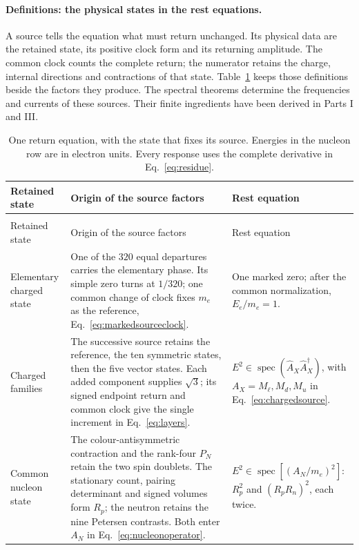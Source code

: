 \documentclass[aps,prx,onecolumn,10pt,notitlepage,nofootinbib,longbibliography]{revtex4-2}
\numberwithin{equation}{section}
\numberwithin{table}{section}
\begin{document}
\paragraph*{Definitions: the physical states in the rest equations.}
A source tells the equation what must return unchanged. Its physical data are the retained state, its positive clock form and its returning amplitude. The common clock counts the complete return; the numerator retains the charge, internal directions and contractions of that state. Table~\ref{tab:masssources} keeps those definitions beside the factors they produce. The spectral theorems determine the frequencies and currents of these sources. Their finite ingredients have been derived in Parts I and III.
\begingroup\small
\setlength{\tabcolsep}{4pt}
\begin{longtable}{@{}>{\raggedright\arraybackslash}p{}>{\raggedright\arraybackslash}p{}>{\raggedright\arraybackslash}p{}@{}}
\caption{One return equation, with the state that fixes its source. Energies in the nucleon row are in electron units. Every response uses the complete derivative in Eq.~\eqref{eq:residue}.}
\label{tab:masssources}\\
\toprule Retained state&Origin of the source factors&Rest equation\\\midrule
\endfirsthead
\multicolumn{3}{l}{\textit{The retained mass sources, continued}}\\
\toprule Retained state&Origin of the source factors&Rest equation\\\midrule
\endhead
\bottomrule\endfoot
Elementary charged state&One of the $320$ equal departures carries the elementary phase. Its simple zero turns at $1/320$; one common change of clock fixes $m_e$ as the reference, Eq.~\eqref{eq:markedsourceclock}.&One marked zero; after the common normalization, $E_e/m_e=1$.\\[6pt]
Charged families&The successive source retains the reference, the ten symmetric states, then the five vector states. Each added component supplies $\sqrt3$; its signed endpoint return and common clock give the single increment in Eq.~\eqref{eq:layers}.&$E^2\in\operatorname{spec}(\widehat A_X\widehat A_X^\dagger)$, with $A_X=M_\ell,M_d,M_u$ in Eq.~\eqref{eq:chargedsource}.\\[6pt]
Common nucleon state&The colour-antisymmetric contraction and the rank-four $P_N$ retain the two spin doublets. The stationary count, pairing determinant and signed volumes form $R_p$; the neutron retains the nine Petersen contrasts. Both enter $A_N$ in Eq.~\eqref{eq:nucleonoperator}.&$E^2\in\operatorname{spec}[(A_N/m_e)^2]$: $R_p^2$ and $(R_pR_n)^2$, each twice.\\[6pt]

\end{longtable}
\end{document}
